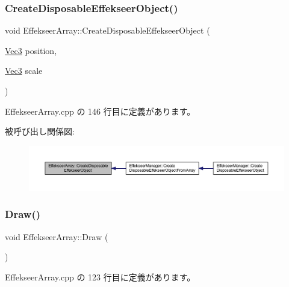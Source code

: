 \subsubsection{\texorpdfstring{Create\+Disposable\+Effekseer\+Object()}{CreateDisposableEffekseerObject()}}
{\footnotesize\ttfamily void Effekseer\+Array\+::\+Create\+Disposable\+Effekseer\+Object (\begin{DoxyParamCaption}\item[{\mbox{\hyperlink{_vector3_d_8h_ab16f59e4393f29a01ec8b9bbbabbe65d}{Vec3}}}]{position,  }\item[{\mbox{\hyperlink{_vector3_d_8h_ab16f59e4393f29a01ec8b9bbbabbe65d}{Vec3}}}]{scale }\end{DoxyParamCaption})}



 Effekseer\+Array.\+cpp の 146 行目に定義があります。

被呼び出し関係図\+:\nopagebreak
\begin{figure}[H]
\begin{center}
\leavevmode
\includegraphics[width=350pt]{class_effekseer_array_a8c86aa79851ef86f253c13765f708383_icgraph}
\end{center}
\end{figure}
\mbox{\label{class_effekseer_array_af915edc4a955bfc7927721a71016524d}} 
\subsubsection{\texorpdfstring{Draw()}{Draw()}}
{\footnotesize\ttfamily void Effekseer\+Array\+::\+Draw (\begin{DoxyParamCaption}{ }\end{DoxyParamCaption})}



 Effekseer\+Array.\+cpp の 123 行目に定義があります。

\mbox{\label{class_effekseer_array_a0bbf7d610ef2219e3699d3f26182af03}} 
